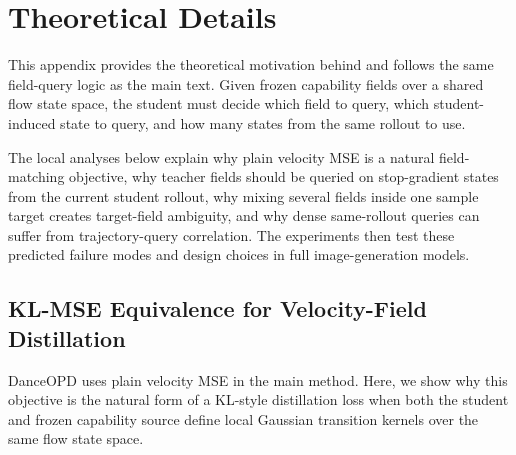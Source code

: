 \section{Theoretical Details}
\label{app:theory}

This appendix provides the theoretical motivation behind \name{} and follows the same field-query logic as the main text. Given frozen capability fields over a shared flow state space, the student must decide which field to query, which student-induced state to query, and how many states from the same rollout to use. 

The local analyses below explain why plain velocity MSE is a natural field-matching objective, why teacher fields should be queried on stop-gradient states from the current student rollout, why mixing several fields inside one sample target creates target-field ambiguity, and why dense same-rollout queries can suffer from trajectory-query correlation. The experiments then test these predicted failure modes and design choices in full image-generation models.


\vspace{0.2cm}


\subsection{KL-MSE Equivalence for Velocity-Field Distillation}
\label{app:kl-mse}

DanceOPD uses plain velocity MSE in the main method. Here, we show why this objective is the natural form of a KL-style distillation loss when both the student and frozen capability source define local Gaussian transition kernels over the same flow state space.

